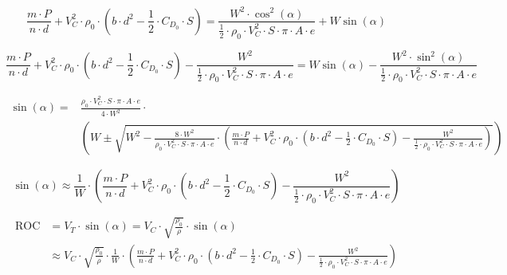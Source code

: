 \documentclass[a4paper,10pt,pdftex]{article}
\begin{document}
\begin{equation}
  \frac{m\cdot{}P}{n\cdot{}d}+V_C^2\cdot\rho_0\cdot\left(b\cdot{}d^2-\frac{1}{2}\cdot{}C_{D_0}\cdot{}S\right)=
  \frac{W^2\cdot\cos^2(\alpha)}{\frac{1}{2}\cdot\rho_0\cdot{}V_C^2\cdot{}S\cdot\pi\cdot{}A\cdot{}e}+W\sin(\alpha)
\end{equation}

\begin{equation}
  \frac{m\cdot{}P}{n\cdot{}d}+V_C^2\cdot\rho_0\cdot\left(b\cdot{}d^2-\frac{1}{2}\cdot{}C_{D_0}\cdot{}S\right)
  -\frac{W^2}{\frac{1}{2}\cdot\rho_0\cdot{}V_C^2\cdot{}S\cdot\pi\cdot{}A\cdot{}e}=
  W\sin(\alpha)-\frac{W^2\cdot\sin^2(\alpha)}{\frac{1}{2}\cdot\rho_0\cdot{}V_C^2\cdot{}S\cdot\pi\cdot{}A\cdot{}e}
\end{equation}

\begin{equation}
  \begin{split}
    \sin(\alpha)=&\frac{\rho_0\cdot{}V_C^2\cdot{}S\cdot\pi\cdot{}A\cdot{}e}{4\cdot{}W^2}\cdot \\
    &\left(W\pm\sqrt{W^2-\frac{8\cdot{}W^2}{\rho_0\cdot{}V_C^2\cdot{}S\cdot\pi\cdot{}A\cdot{}e}\cdot
        \left(\frac{m\cdot{}P}{n\cdot{}d}+V_C^2\cdot\rho_0\cdot\left(b\cdot{}d^2-\frac{1}{2}\cdot{}C_{D_0}\cdot{}S\right)
          -\frac{W^2}{\frac{1}{2}\cdot\rho_0\cdot{}V_C^2\cdot{}S\cdot\pi\cdot{}A\cdot{}e}\right)}\right)
  \end{split}
\end{equation}

\begin{equation}
  \sin(\alpha)\approx\frac{1}{W}\cdot\left(\frac{m\cdot{}P}{n\cdot{}d}+V_C^2\cdot\rho_0\cdot\left(b\cdot{}d^2-\frac{1}{2}\cdot{}C_{D_0}\cdot{}S\right)
  -\frac{W^2}{\frac{1}{2}\cdot\rho_0\cdot{}V_C^2\cdot{}S\cdot\pi\cdot{}A\cdot{}e}\right)
\end{equation}

\begin{equation}
  \begin{split}
    \mathrm{ROC} &= V_T\cdot\sin(\alpha) = V_C\cdot\sqrt{\frac{\rho_0}{\rho}}\cdot\sin(\alpha) \\
    &\approx{}V_C\cdot\sqrt{\frac{\rho_0}{\rho}}\cdot\frac{1}{W}\cdot\left(\frac{m\cdot{}P}{n\cdot{}d}+V_C^2\cdot\rho_0\cdot\left(b\cdot{}d^2-\frac{1}{2}\cdot{}C_{D_0}\cdot{}S\right)
      -\frac{W^2}{\frac{1}{2}\cdot\rho_0\cdot{}V_C^2\cdot{}S\cdot\pi\cdot{}A\cdot{}e}\right)
  \end{split}
\end{equation}
\end{document}
